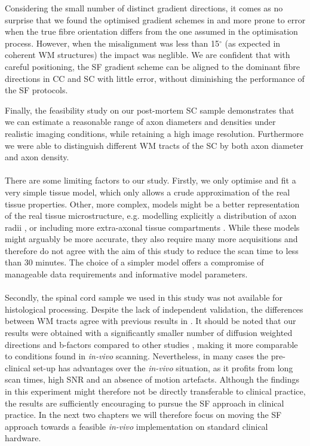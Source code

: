 Considering the small number of distinct gradient directions, it comes as no surprise that we found the optimised gradient schemes in {\FD} and {\DO} more prone to error when the true fibre orientation differs from the one assumed in the optimisation process. However, when the misalignment was less than 15$^\circ$ (as expected in coherent WM structures) the impact was neglible. We are confident that with careful positioning, the {\gls{SF}} gradient scheme can be aligned to the dominant fibre directions in CC and SC with little error, without diminishing the performance of the {\gls{SF}} protocols.


Finally, the feasibility study on our post-mortem SC sample demonstrates that we can estimate a reasonable range of axon diameters and densities under realistic imaging conditions, while retaining a high image resolution. Furthermore we were able to distinguish different WM tracts of the SC by both axon diameter and axon density.
\paragraph{}
There are some limiting factors to our study. Firstly, we only optimise and fit a very simple tissue model, which only allows a crude approximation of the real tissue properties. Other, more complex, models might be a better representation of the real tissue microstructure, e.g. modelling explicitly a distribution of axon radii \citep{Barazany:2009}, or including more extra-axonal tissue compartments \citep{Stanisz:1997,Wang:2011,Panagiotaki:2012}.  While these models might arguably be more accurate, they also require many more acquisitions and therefore do not agree with the aim of this study to reduce the scan time to less than 30 minutes. The choice of a simpler model offers a compromise of manageable data requirements and informative model parameters.
\paragraph{}
Secondly, the spinal cord sample we used in this study was not available for histological processing. Despite the lack of independent validation, the differences between WM tracts agree with previous results in \citep{Golabchi:2010}. It should be noted that our results were obtained with a significantly smaller number of diffusion weighted directions and b-factors compared to other studies \citep{Assaf:2008,Barazany:2009,Panagiotaki:2012}, making it more comparable to conditions found in \emph{in-vivo} scanning. Nevertheless, in many cases the pre-clinical set-up has advantages over the \emph{in-vivo} situation, as it profits from long scan times, high \gls{SNR} and an absence of motion artefacts. Although the findings in this experiment might therefore not be directly transferable to clinical practice, the results are sufficiently encouraging to pursue the \gls{SF}{} approach in clinical practice. In the next two chapters we will therefore focus on moving the \gls{SF}{} approach towards a feasible \emph{in-vivo} implementation on standard clinical hardware.


